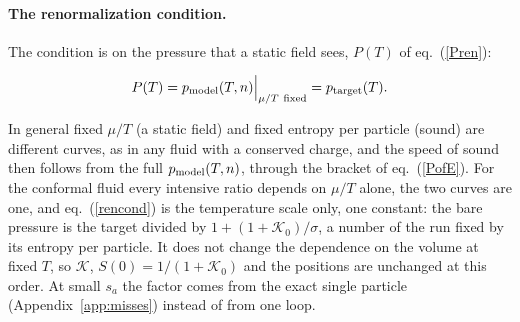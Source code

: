 \documentclass[11pt,aps,preprint,nofootinbib,superscriptaddress,tightenlines]{revtex4-2}
\def\st{\begin{equation}}
\def\stp{\end{equation}}
\def\Eq#1{eq.~(\ref{#1})}
\def\App#1{Appendix~\ref{#1}}
\let\oldparagraph\paragraph
\renewcommand{\paragraph}{\par\bigskip\oldparagraph}
\begin{document}
\paragraph{The renormalization condition.}  The condition is on the pressure that a static field sees, $P(T)$ of \Eq{Pren}:
\begin{keyeq}
\st
P(T)=p_{\rm model}(T,n)\Big|_{\mu/T\ \text{fixed}}=p_{\rm target}(T) .
\label{rencond}
\stp
\end{keyeq}
In general fixed $\mu/T$ (a static field) and fixed entropy per particle (sound) are different curves, as in any fluid with a conserved charge, and the
speed of sound then follows from the full $p_{\rm model}(T,n)$, through the bracket of \Eq{PofE}.  For the conformal fluid every intensive ratio depends on
$\mu/T$ alone, the two curves are one, and \Eq{rencond} is the temperature scale only, one constant: the bare pressure is the target divided by $1+(1+\mathcal K_0)/\sigma$, a number of the run fixed by its
entropy per particle.  It does not change the dependence on the volume at fixed $T$, so $\mathcal K$, $S(0)=1/(1+\mathcal K_0)$ and the positions are
unchanged at this order.  At small $s_a$ the factor comes from the exact single particle (\App{app:misses}) instead of from one loop.
\end{document}
